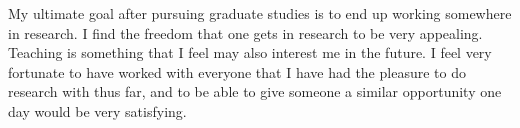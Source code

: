 \documentclass[a4paper,12pt]{article}
\newcommand{\tab}{\hspace*{2em}}
\begin{document}
\tab My ultimate goal after pursuing graduate studies is to end up working somewhere in research. I find the freedom that one gets in research to be very appealing. Teaching is something that I feel may also interest me in the future. I feel very fortunate to have worked with everyone that I have had the pleasure to do research with thus far, and to be able to give someone a similar opportunity one day would be very satisfying.
\end{document}
